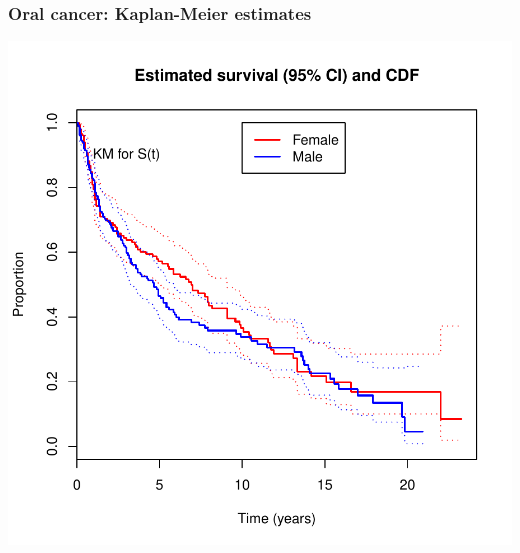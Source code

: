 \documentclass[handout,12pt,dvipsnames,t]{beamer}
\begin{document}
\begin{frame}[fragile]
\frametitle{Oral cancer: Kaplan-Meier estimates}

\includegraphics{Survival_competing_risk-km}



\end{frame}
\end{document}
